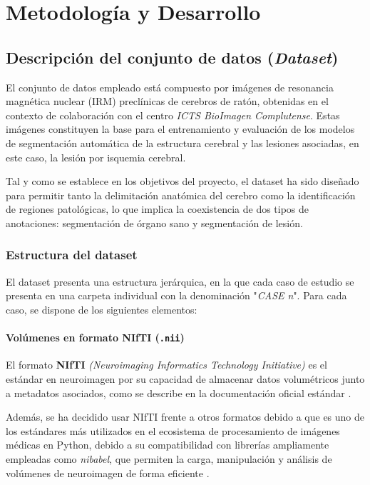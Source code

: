 \chapter{Metodología y Desarrollo}
\label{cap:descripcionTrabajo}


\section{Descripción del conjunto de datos (\textit{Dataset})}
 El conjunto de datos empleado está compuesto por imágenes de resonancia magnética nuclear (IRM) preclínicas de cerebros de ratón, obtenidas en el contexto de colaboración con el centro \textit{ICTS BioImagen Complutense}. Estas imágenes constituyen la base para el entrenamiento y evaluación de los modelos de segmentación automática de la estructura cerebral y las lesiones asociadas, en este caso, la lesión por isquemia cerebral.

 Tal y como se establece en los objetivos del proyecto, el dataset ha sido diseñado para permitir tanto la delimitación anatómica del cerebro como la identificación de regiones patológicas, lo que implica la coexistencia de dos tipos de anotaciones: segmentación de órgano sano y segmentación de lesión.
  
\subsection{Estructura del dataset}
El dataset presenta una estructura jerárquica, en la que cada caso de estudio se presenta en una carpeta individual con la denominación "\textit{CASE n}". 
Para cada caso, se dispone de los siguientes elementos:

\subsubsection{Volúmenes en formato NIfTI (\texttt{.nii})}
El formato \textbf{NIfTI} \textit{(Neuroimaging Informatics Technology Initiative)} es el estándar en neuroimagen por su capacidad de almacenar datos volumétricos junto a metadatos asociados, como se describe en la documentación oficial estándar \citep{nifti} .

Además, se ha decidido usar NIfTI frente a otros formatos debido a que es uno de los estándares más utilizados en el ecosistema de procesamiento de imágenes médicas en Python, debido a su compatibilidad con librerías ampliamente empleadas como \textit{nibabel}, que permiten la carga, manipulación y análisis de volúmenes de neuroimagen de forma eficiente \citep{nifti,nibabel}.

